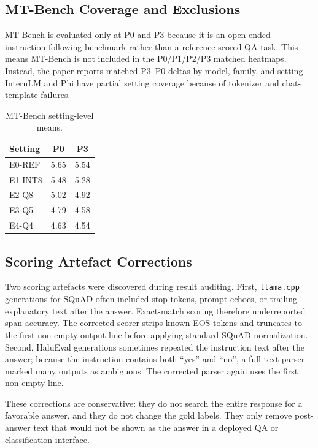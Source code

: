 \documentclass[letterpaper]{article} %
\begin{document}
\subsection{MT-Bench Coverage and Exclusions}

MT-Bench is evaluated only at P0 and P3 because it is an open-ended
instruction-following benchmark rather than a reference-scored QA task. This
means MT-Bench is not included in the P0/P1/P2/P3 matched heatmaps. Instead,
the paper reports matched P3--P0 deltas by model, family, and setting.
InternLM and Phi have partial setting coverage because of tokenizer and
chat-template failures.

\begin{table}[t]
  \small\centering
  \caption{MT-Bench setting-level means.}
  \label{tab:app_mtbench_setting}
  \begin{tabular}{@{}lcc@{}}
    \toprule
    Setting & P0 & P3 \\
    \midrule
    E0-REF  & 5.65 & 5.54 \\
    E1-INT8 & 5.48 & 5.28 \\
    E2-Q8   & 5.02 & 4.92 \\
    E3-Q5   & 4.79 & 4.58 \\
    E4-Q4   & 4.63 & 4.54 \\
    \bottomrule
  \end{tabular}
\end{table}

\subsection{Scoring Artefact Corrections}

Two scoring artefacts were discovered during result auditing. First,
\texttt{llama.cpp} generations for SQuAD often included stop tokens, prompt
echoes, or trailing explanatory text after the answer. Exact-match scoring
therefore underreported span accuracy. The corrected scorer strips known EOS
tokens and truncates to the first non-empty output line before applying standard
SQuAD normalization. Second, HaluEval generations sometimes repeated the
instruction text after the answer; because the instruction contains both
``yes'' and ``no'', a full-text parser marked many outputs as ambiguous. The
corrected parser again uses the first non-empty line.

These corrections are conservative: they do not search the entire response for
a favorable answer, and they do not change the gold labels. They only remove
post-answer text that would not be shown as the answer in a deployed QA or
classification interface.
\end{document}
